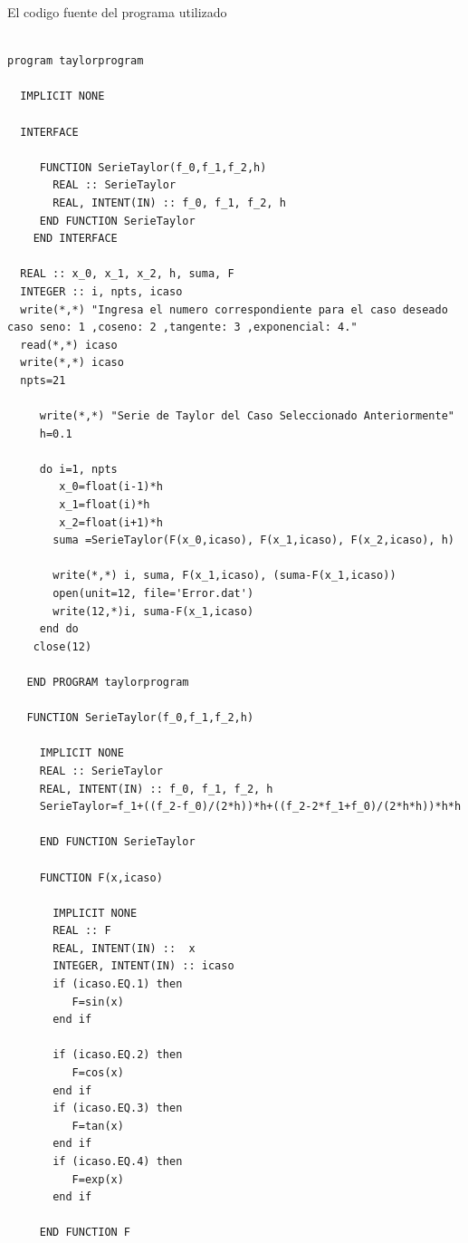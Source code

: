 \begin{large}
 El codigo fuente del programa utilizado
 \end{large} 
 
\begin{verbatim}

program taylorprogram
  
  IMPLICIT NONE

  INTERFACE
     
     FUNCTION SerieTaylor(f_0,f_1,f_2,h)
       REAL :: SerieTaylor
       REAL, INTENT(IN) :: f_0, f_1, f_2, h
     END FUNCTION SerieTaylor
    END INTERFACE
 
  REAL :: x_0, x_1, x_2, h, suma, F
  INTEGER :: i, npts, icaso  
  write(*,*) "Ingresa el numero correspondiente para el caso deseado caso seno: 1 ,coseno: 2 ,tangente: 3 ,exponencial: 4."
  read(*,*) icaso
  write(*,*) icaso  
  npts=21
    
     write(*,*) "Serie de Taylor del Caso Seleccionado Anteriormente"
     h=0.1
   
     do i=1, npts
        x_0=float(i-1)*h
        x_1=float(i)*h
        x_2=float(i+1)*h
       suma =SerieTaylor(F(x_0,icaso), F(x_1,icaso), F(x_2,icaso), h)
     
       write(*,*) i, suma, F(x_1,icaso), (suma-F(x_1,icaso))               
       open(unit=12, file='Error.dat')
       write(12,*)i, suma-F(x_1,icaso)      
     end do
    close(12)
  
   END PROGRAM taylorprogram   
   
   FUNCTION SerieTaylor(f_0,f_1,f_2,h)
    
     IMPLICIT NONE
     REAL :: SerieTaylor
     REAL, INTENT(IN) :: f_0, f_1, f_2, h
     SerieTaylor=f_1+((f_2-f_0)/(2*h))*h+((f_2-2*f_1+f_0)/(2*h*h))*h*h
    
     END FUNCTION SerieTaylor
    
     FUNCTION F(x,icaso)
      
       IMPLICIT NONE
       REAL :: F
       REAL, INTENT(IN) ::  x
       INTEGER, INTENT(IN) :: icaso
       if (icaso.EQ.1) then
          F=sin(x)
       end if      
  
       if (icaso.EQ.2) then
          F=cos(x)
       end if
       if (icaso.EQ.3) then
          F=tan(x)
       end if
       if (icaso.EQ.4) then
          F=exp(x)
       end if  
     
     END FUNCTION F
     

\end{verbatim} 

